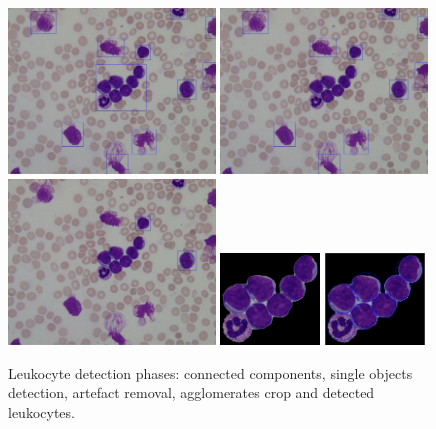 \documentclass[final,a4paper,12pt,english]{UnicaPhdThesis3}
\begin{document}
	\begin{figure}[!t]
		\centering
		\includegraphics[width=0.49\textwidth]{images/2016_1_mva/DetectedIm001_1}
		\includegraphics[width=0.49\textwidth]{images/2016_1_mva/DetectedIm001_1small}
		\includegraphics[width=0.49\textwidth]{images/2016_1_mva/DetectedIm001_1solid}
		\includegraphics[width=0.236\textwidth]{images/2016_1_mva/agglomerateclosed}
		\includegraphics[width=0.236\textwidth]{images/2016_1_mva/agglomeratehough}
		\caption{\label{fig:ex9}Leukocyte detection phases: connected components, single objects detection, artefact removal, agglomerates crop and detected leukocytes.}
	\end{figure}
\end{document}
